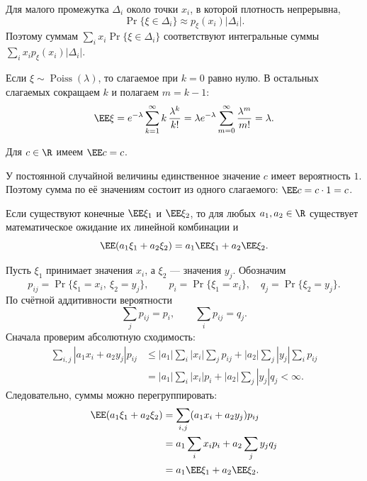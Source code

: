 Для малого промежутка $\Delta_i$ около точки $x_i$, в которой плотность
непрерывна,
\[
    \Pr\{\xi\in\Delta_i\}\approx p_\xi(x_i)|\Delta_i|.
\]
Поэтому суммам $\sum_i x_i\Pr\{\xi\in\Delta_i\}$ соответствуют
интегральные суммы $\sum_i x_i p_\xi(x_i)|\Delta_i|$.

\begin{example}
Если $\xi\sim\operatorname{Poiss}(\lambda)$, то слагаемое при $k=0$ равно нулю. В остальных слагаемых сокращаем $k$ и полагаем $m=k-1$:
\[
 \EE\xi=e^{-\lambda}\sum_{k=1}^{\infty}k\,\frac{\lambda^k}{k!}
 =\lambda e^{-\lambda}\sum_{m=0}^{\infty}\frac{\lambda^m}{m!}
 =\lambda.
\]
\end{example}


\begin{theorem}
    Для $c\in\R$ имеем $\EE c=c$.
\end{theorem}

\begin{Proof}
У постоянной случайной величины единственное значение $c$ имеет
вероятность $1$. Поэтому сумма по её значениям состоит из одного
слагаемого: $\EE c=c\cdot 1=c$.
\end{Proof}

\begin{theorem}
Если существуют конечные $\EE\xi_1$ и $\EE\xi_2$, то для любых
    $a_1,a_2\in\R$ существует математическое ожидание их линейной комбинации и
    \[
        \EE(a_1\xi_1+a_2\xi_2)
        =a_1\EE\xi_1+a_2\EE\xi_2.
    \]
\end{theorem}

\begin{Proof}
    Пусть $\xi_1$ принимает значения $x_i$, а $\xi_2$ --- значения $y_j$.
    Обозначим
    \[
        p_{ij}=\Pr\{\xi_1=x_i,\ \xi_2=y_j\},\qquad
        p_i=\Pr\{\xi_1=x_i\},\quad q_j=\Pr\{\xi_2=y_j\}.
    \]
    По счётной аддитивности вероятности
    \[
        \sum_j p_{ij}=p_i,\qquad \sum_i p_{ij}=q_j.
    \]
    Сначала проверим абсолютную сходимость:
    \[
        \begin{aligned}
            \sum_{i,j}|a_1x_i+a_2y_j|p_{ij}
            &\leq |a_1|\sum_i|x_i|\sum_jp_{ij}
                  +|a_2|\sum_j|y_j|\sum_ip_{ij}\\
            &=|a_1|\sum_i|x_i|p_i+|a_2|\sum_j|y_j|q_j<\infty.
        \end{aligned}
    \]
    Следовательно, суммы можно перегруппировать:
    \[
        \begin{aligned}
            \EE(a_1\xi_1+a_2\xi_2)
            &=\sum_{i,j}(a_1x_i+a_2y_j)p_{ij}\\
            &=a_1\sum_i x_i p_i+a_2\sum_j y_j q_j\\
            &=a_1\EE\xi_1+a_2\EE\xi_2.
        \end{aligned}
    \]
\end{Proof}

